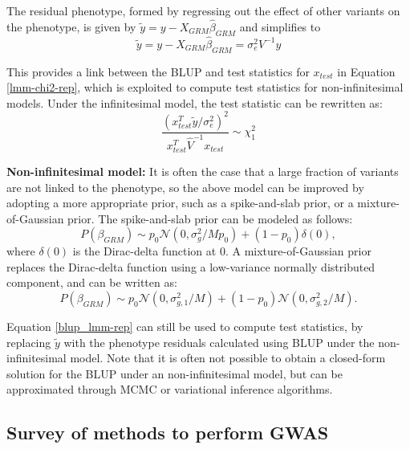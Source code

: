 %
The residual phenotype, formed by regressing out the effect of other variants on the phenotype, is given by $\tilde{y} = y - X_{GRM} \hat{\beta}_{GRM}$ and simplifies to
\begin{equation}
    \tilde{y} = y - X_{GRM} \hat{\beta}_{GRM} = \sigma_e^2 V^{-1} y
    \label{blup_lmm_link}
\end{equation}

%
This provides a link between the BLUP and test statistics for $x_{test}$ in Equation \ref{lmm-chi2-rep}, which is exploited to compute test statistics for non-infinitesimal models.
%
Under the infinitesimal model, the test statistic can be rewritten as:
\begin{equation}
    \frac{(x_{test}^T \tilde{y}/\sigma_e^2)^2}{x_{test}^T \hat{V}^{-1} x_{test}} \sim \chi^2_1
    \label{blup_lmm-rep}
\end{equation}

%
%
\textbf{Non-infinitesimal model: }
%
It is often the case that a large fraction of variants are not linked to the phenotype, so the above model can be improved by adopting a more appropriate prior, such as a spike-and-slab prior, or a mixture-of-Gaussian prior.
%
The spike-and-slab prior can be modeled as follows:
\begin{equation}
P(\beta_{GRM}) \sim p_0 \mathcal{N} (0, \sigma_g^2/Mp_0) + (1-p_0) \delta(0),
\end{equation}
where $\delta(0)$ is the Dirac-delta function at $0$.
%
A mixture-of-Gaussian prior replaces the Dirac-delta function using a low-variance normally distributed component, and can be written as:
\begin{equation}
P(\beta_{GRM}) \sim p_0 \mathcal{N} (0, \sigma_{g,1}^2/M) + (1-p_0) \mathcal{N} (0, \sigma_{g,2}^2/M).
\end{equation}

%

%
Equation \ref{blup_lmm-rep} can still be used to compute test statistics, by replacing $\tilde{y}$ with the phenotype residuals calculated using BLUP under the non-infinitesimal model.
%
Note that it is often not possible to obtain a closed-form solution for the BLUP under an non-infinitesimal model, but can be approximated through MCMC or variational inference algorithms.

\subsection{Survey of methods to perform GWAS}

